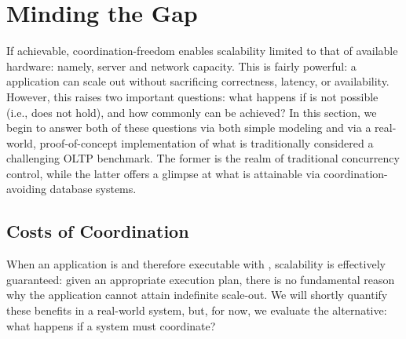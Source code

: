 
\section{Minding the Gap}
\label{sec:evaluation}

If achievable, coordination-freedom enables scalability limited to
that of available hardware: namely, server and network capacity. This
is fairly powerful: a \cfree application can scale out without
sacrificing correctness, latency, or availability. However, this
raises two important questions: what happens if \cfreedom is not
possible (i.e., \iconfluence does not hold), and how commonly can
\cfreedom be achieved? In this section, we begin to answer both of
these questions via both simple modeling and via a real-world,
proof-of-concept implementation of what is traditionally considered a
challenging OLTP benchmark. The former is the realm of traditional
concurrency control, while the latter offers a glimpse at what is
attainable via coordination-avoiding database systems.

\subsection{Costs of Coordination}

When an application is \iconfluent and therefore executable with
\cfreedom, scalability is effectively guaranteed: given an appropriate
execution plan, there is no fundamental reason why the application
cannot attain indefinite scale-out. We will shortly quantify these
benefits in a real-world system, but, for now, we evaluate the
alternative: what happens if a system must coordinate?

